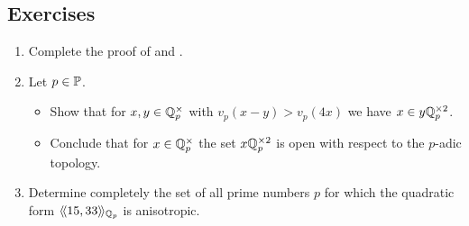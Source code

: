 \documentclass[12pt, leqno, british]{amsart}
\begin{document}
\subsection{Exercises}
\begin{enumerate}
\item Complete the proof of  and .
\item\label{ex:local-squares-open} Let $p \in \mathbb P$.
\begin{itemize}
\item Show that for $x, y \in \mathbb Q_p^\times$ with $v_p(x - y) > v_p(4x)$ we have $x \in y\mathbb Q_p^{\times 2}$.
\item Conclude that for $x \in \mathbb Q_p^\times$ the set $x\mathbb Q_p^{\times 2}$ is open with respect to the $p$-adic topology.
\end{itemize}
\item Determine completely the set of all prime numbers $p$ for which the quadratic form $\langle\!\langle 15, 33 \rangle\!\rangle_{\mathbb Q_p}$ is anisotropic.
\end{enumerate}
\end{document}
